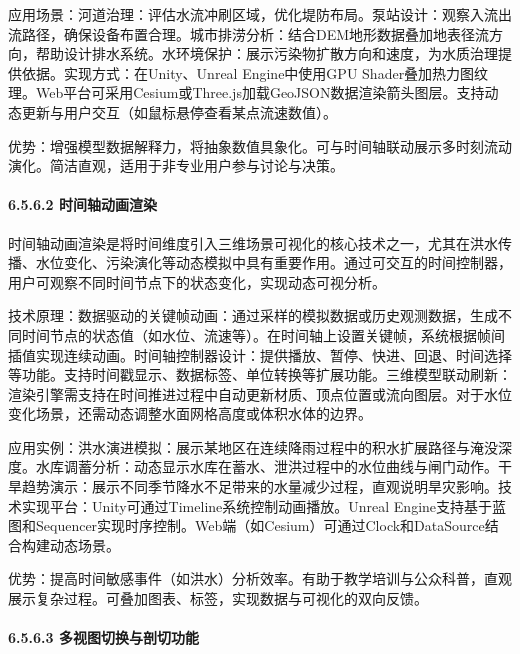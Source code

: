 应用场景：河道治理：评估水流冲刷区域，优化堤防布局。泵站设计：观察入流出流路径，确保设备布置合理。城市排涝分析：结合DEM地形数据叠加地表径流方向，帮助设计排水系统。水环境保护：展示污染物扩散方向和速度，为水质治理提供依据。实现方式：在Unity、Unreal Engine中使用GPU Shader叠加热力图纹理。Web平台可采用Cesium或Three.js加载GeoJSON数据渲染箭头图层。支持动态更新与用户交互（如鼠标悬停查看某点流速数值）。

优势：增强模型数据解释力，将抽象数值具象化。可与时间轴联动展示多时刻流动演化。简洁直观，适用于非专业用户参与讨论与决策。

\hypertarget{ux65f6ux95f4ux8f74ux52a8ux753bux6e32ux67d3}{%
\paragraph{6.5.6.2 时间轴动画渲染}\label{ux65f6ux95f4ux8f74ux52a8ux753bux6e32ux67d3}}

时间轴动画渲染是将时间维度引入三维场景可视化的核心技术之一，尤其在洪水传播、水位变化、污染演化等动态模拟中具有重要作用。通过可交互的时间控制器，用户可观察不同时间节点下的状态变化，实现动态可视分析。

技术原理：数据驱动的关键帧动画：通过采样的模拟数据或历史观测数据，生成不同时间节点的状态值（如水位、流速等）。在时间轴上设置关键帧，系统根据帧间插值实现连续动画。时间轴控制器设计：提供播放、暂停、快进、回退、时间选择等功能。支持时间戳显示、数据标签、单位转换等扩展功能。三维模型联动刷新：渲染引擎需支持在时间推进过程中自动更新材质、顶点位置或流向图层。对于水位变化场景，还需动态调整水面网格高度或体积水体的边界。

应用实例：洪水演进模拟：展示某地区在连续降雨过程中的积水扩展路径与淹没深度。水库调蓄分析：动态显示水库在蓄水、泄洪过程中的水位曲线与闸门动作。干旱趋势演示：展示不同季节降水不足带来的水量减少过程，直观说明旱灾影响。技术实现平台：Unity可通过Timeline系统控制动画播放。Unreal Engine支持基于蓝图和Sequencer实现时序控制。Web端（如Cesium）可通过Clock和DataSource结合构建动态场景。

优势：提高时间敏感事件（如洪水）分析效率。有助于教学培训与公众科普，直观展示复杂过程。可叠加图表、标签，实现数据与可视化的双向反馈。

\hypertarget{ux591aux89c6ux56feux5207ux6362ux4e0eux5256ux5207ux529fux80fd}{%
\paragraph{6.5.6.3 多视图切换与剖切功能}\label{ux591aux89c6ux56feux5207ux6362ux4e0eux5256ux5207ux529fux80fd}}

